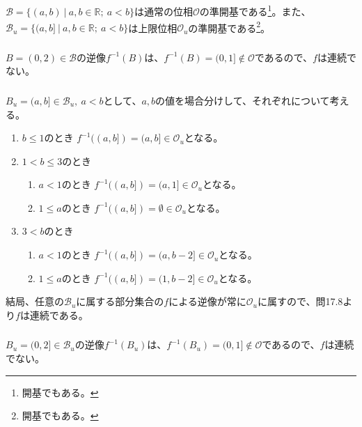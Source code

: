 \documentclass{jsarticle}
\begin{document}
\subsection{}
$\mathcal{B}=\{(a,b)\ |\ a,b\in \mathbb{R};\ a<b\}$は通常の位相$\mathcal{O}$の準開基である\footnote{開基でもある。}。また、$\mathcal{B}_u=\{(a,b]\ |\ a,b\in\mathbb{R};\ a<b\}$は上限位相$\mathcal{O}_u$の準開基である\footnote{開基でもある。}。
\subsubsection{}
$B=(0,2)\in\mathcal{B}$の逆像$f^{-1}(B)$は、$f^{-1}(B)=(0,1]\notin\mathcal{O}$であるので、$f$は連続でない。
\subsubsection{}
$B_u=(a,b]\in\mathcal{B}_u,\ a<b$として、$a,b$の値を場合分けして、それぞれについて考える。
\begin{enumerate}
\item{$b\leq 1$のとき}
$f^{-1}((a,b])=(a,b]\in\mathcal{O}_u$となる。
\item{$1<b\leq 3$のとき}
\begin{enumerate}
\item{$a<1$のとき}
$f^{-1}((a,b])=(a,1]\in\mathcal{O}_u$となる。
\item{$1\leq a$のとき}
$f^{-1}((a,b])=\emptyset\in\mathcal{O}_u$となる。
\end{enumerate}
\item{$3<b$のとき}
\begin{enumerate}
\item{$a<1$のとき}
$f^{-1}((a,b])=(a,b-2]\in\mathcal{O}_u$となる。
\item{$1\leq a$のとき}
$f^{-1}((a,b])=(1,b-2]\in\mathcal{O}_u$となる。
\end{enumerate}
\end{enumerate}
結局、任意の$\mathcal{B}_u$に属する部分集合の$f$による逆像が常に$\mathcal{O}_u$に属すので、問17.8より$f$は連続である。
\subsubsection{}
$B_u=(0,2]\in\mathcal{B}_u$の逆像$f^{-1}(B_u)$は、$f^{-1}(B_u)=(0,1]\notin\mathcal{O}$であるので、$f$は連続でない。
\end{document}
